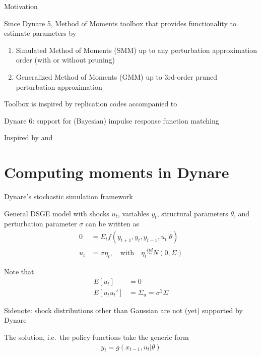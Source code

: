 
\begin{frame}{Motivation}
  \begin{witemize}
    \item Since Dynare 5, Method of Moments toolbox that provides functionality to
    estimate parameters by
    \begin{enumerate}
      \item Simulated Method of Moments (SMM) up to any perturbation
            approximation order (with or without pruning)
      \item Generalized Method of Moments (GMM) up to 3rd-order pruned
            perturbation approximation
    \end{enumerate}
    \item Toolbox is inspired by replication codes accompanied to \textcite{AndreasenEtal2018,BornPfeifer2014JME,Mutschler2018}
    \item Dynare 6: support for (Bayesian) impulse response function matching
    \item Inspired by \textcite{CEE2005} and \textcite{ChristianoTrabandtWalentin2010}
  \end{witemize}

\end{frame}


\section[Moments]{Computing moments in Dynare}
\begin{frame}{Dynare's stochastic simulation framework}

  \begin{witemize}
    \item General DSGE model with shocks $u_t$, variables $y_t$, structural parameters $\theta$, and perturbation parameter $\sigma$ can be written as
    \begin{align}
      0   & =E_t f(y_{t+1}, y_t, y_{t-1}, u_t | \theta)                                     \\
      u_t & = \sigma \eta_t, \quad \text{with} \quad \eta_t \overset{iid}{\sim} N(0,\Sigma)
    \end{align}
    \item Note that
    \begin{align}
      E[u_t]      & = 0                          \\
      E[u_t u_t'] & = \Sigma_u = \sigma^2 \Sigma
    \end{align}

    \item Sidenote: shock distributions other than Gaussian are not (yet) supported by Dynare
    \item The solution, i.e.\ the policy functions take the generic form
    \begin{align}
      y_t = g(x_{t-1}, u_t | \theta)
    \end{align}
  \end{witemize}

\end{frame}

